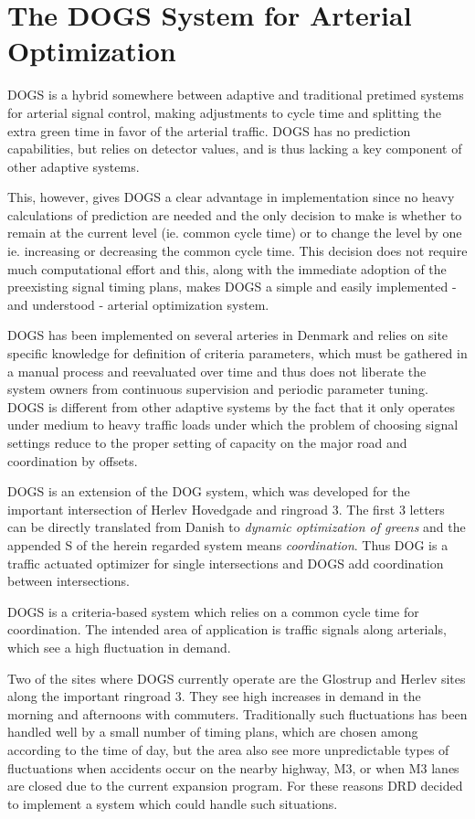 \section{The DOGS System for Arterial Optimization}
\label{dogs}

DOGS is a hybrid somewhere between adaptive and traditional pretimed systems for arterial signal control, making adjustments to cycle time and splitting the extra green time in favor of the arterial traffic. DOGS has no prediction capabilities, but relies on detector values, and is thus lacking a key component of other adaptive systems. 

This, however, gives DOGS a clear advantage in implementation since no heavy calculations of prediction are needed and the only decision to make is whether to remain at the current level (ie. common cycle time) or to change the level by one ie. increasing or decreasing the common cycle time. This decision does not require much computational effort and this, along with the immediate adoption of the preexisting signal timing plans, makes DOGS a simple and easily implemented - and understood - arterial optimization system.

DOGS has been implemented on several arteries in Denmark and relies on site specific knowledge for definition of criteria parameters, which must be gathered in a manual process and reevaluated over time and thus does not liberate the system owners from continuous supervision and periodic parameter tuning.
DOGS is different from other adaptive systems by the fact that it only operates under medium to heavy traffic loads under which the problem of choosing signal settings reduce to the proper setting of capacity on the major road and coordination by offsets.

DOGS is an extension of the DOG system, which was developed for the important intersection of Herlev Hovedgade and ringroad 3. The first 3 letters can be directly translated from Danish to \textit{dynamic optimization of greens} and the appended S of the herein regarded system means \textit{coordination}. Thus DOG is a traffic actuated optimizer for single intersections and DOGS add coordination between intersections.

DOGS is a criteria-based system which relies on a common cycle time for coordination. The intended area of application is traffic signals along arterials, which see a high fluctuation in demand. 

Two of the sites where DOGS currently operate are the Glostrup and Herlev sites along the important ringroad 3. They see high increases in demand in the morning and afternoons with commuters. Traditionally such fluctuations has been handled well by a small number of timing plans, which are chosen among according to the time of day, but the area also see more unpredictable types of fluctuations when accidents occur on the nearby highway, M3, or when M3 lanes are closed due to the current expansion program. For these reasons DRD decided to implement a system which could handle such situations.

